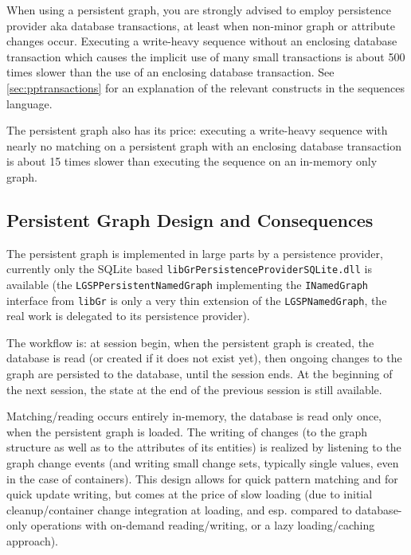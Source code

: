 \begin{warning}
When using a persistent graph, you are strongly advised to employ persistence provider aka database transactions, at least when non-minor graph or attribute changes occur.
Executing a write-heavy sequence without an enclosing database transaction which causes the implicit use of many small transactions is about 500 times slower than the use of an enclosing database transaction.
See \ref{sec:pptransactions} for an explanation of the relevant constructs in the sequences language.
\end{warning}

\begin{note}
The persistent graph also has its price: executing a write-heavy sequence with nearly no matching on a persistent graph with an enclosing database transaction is about 15 times slower than executing the sequence on an in-memory only graph.
\end{note}

\subsection*{Persistent Graph Design and Consequences}
The persistent graph is implemented in large parts by a persistence provider, currently only the SQLite based \texttt{libGrPersistenceProviderSQLite.dll} is available (the \texttt{LGSP\-Persistent\-Named\-Graph} implementing the \texttt{INamedGraph} interface from \texttt{libGr} is only a very thin extension of the \texttt{LGSPNamedGraph}, the real work is delegated to its persistence provider). 

The workflow is: at session begin, when the persistent graph is created, the database is read (or created if it does not exist yet), then ongoing changes to the graph are persisted to the database, until the session ends.
At the beginning of the next session, the state at the end of the previous session is still available.

Matching/reading occurs entirely in-memory, the database is read only once, when the persistent graph is loaded.
The writing of changes (to the graph structure as well as to the attributes of its entities) is realized by listening to the graph change events (and writing small change sets, typically single values, even in the case of containers).
This design allows for quick pattern matching and for quick update writing, but comes at the price of slow loading (due to initial cleanup/container change integration at loading, and esp. compared to database-only operations with on-demand reading/writing, or a lazy loading/caching approach).

